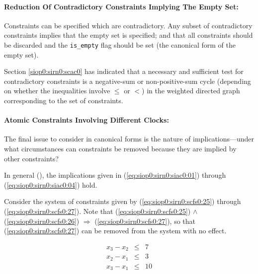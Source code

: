 \paragraph{Reduction Of Contradictory Constraints Implying The Empty Set:}

Constraints can be specified which are contradictory.  Any subset
of contradictory constraints implies that the empty set is specified;
and that all constraints should be discarded and the 
\texttt{is\_empty} flag should be set (the canonical form of the 
empty set).

Section \ref{siop0:sirn0:scac0} has indicated that a necessary 
and sufficient
test for contradictory constraints is a negative-sum or non-positive-sum cycle 
(depending on whether the inequalities involve $\leq$ or $<$) in
the weighted directed graph corresponding to the set of constraints.


\paragraph{Atomic Constraints Involving Different Clocks:}

The final issue to consider in canonical forms is the nature of 
implications---under what circumstances can constraints be removed
because they are implied by other constraints?

In general (\cite[p. 288]{bib:b:modelchecking:clark1999}), 
the implications given in 
(\ref{eq:siop0:sirn0:siac0:01})
through 
(\ref{eq:siop0:sirn0:siac0:04})
hold.

Consider the system of constraints given by
(\ref{eq:siop0:sirn0:scfs0:25}) through 
(\ref{eq:siop0:sirn0:scfs0:27}).  Note that 
(\ref{eq:siop0:sirn0:scfs0:25}) $\wedge$ (\ref{eq:siop0:sirn0:scfs0:26})
$\Longrightarrow$ (\ref{eq:siop0:sirn0:scfs0:27}), so that 
(\ref{eq:siop0:sirn0:scfs0:27}) can be removed from the system
with no effect.

\begin{eqnarray}
\label{eq:siop0:sirn0:scfs0:25} 
   x_3 - x_2 & \leq & 7     \\
\label{eq:siop0:sirn0:scfs0:26}
   x_2 - x_1 & \leq & 3     \\
\label{eq:siop0:sirn0:scfs0:27}
   x_3 - x_1 & \leq & 10  
\end{eqnarray}

